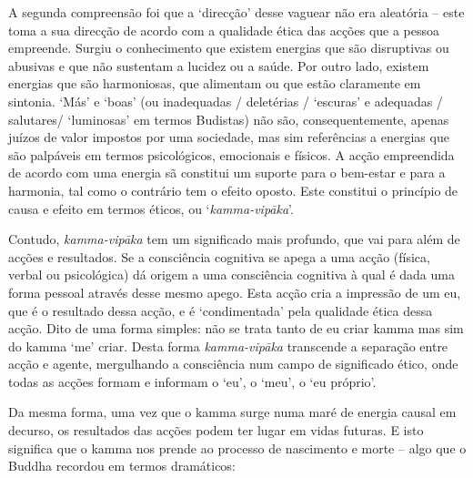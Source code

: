 A segunda compreensão foi que a `direcção' desse vaguear não era aleatória --
este toma a sua direcção de acordo com a qualidade ética das acções que a pessoa
empreende. Surgiu o conhecimento que existem energias que são disruptivas ou
abusivas e que não sustentam a lucidez ou a saúde. Por outro lado, existem
energias que são harmoniosas, que alimentam ou que estão claramente em sintonia.
`Más' e `boas' (ou inadequadas / deletérias / `escuras' e
adequadas / salutares/ `luminosas' em termos Budistas) não são, consequentemente,
apenas juízos de valor impostos por uma sociedade, mas sim referências a
energias que são palpáveis em termos psicológicos, emocionais e físicos. A acção
empreendida de acordo com uma energia sã constitui um suporte para o bem-estar e
para a harmonia, tal como o contrário tem o efeito oposto. Este constitui o
princípio de causa e efeito em termos éticos, ou `\emph{kamma-vipāka}'.

Contudo, \emph{kamma-vipāka} tem um significado mais profundo, que vai para além
de acções e resultados. Se a consciência cognitiva se apega a uma acção (física,
verbal ou psicológica) dá origem a uma consciência cognitiva à qual é dada uma
forma pessoal através desse mesmo apego. Esta acção cria a impressão de um eu,
que é o resultado dessa acção, e é `condimentada' pela qualidade ética dessa
acção. Dito de uma forma simples: não se trata tanto de eu criar kamma mas sim
do kamma `me' criar. Desta forma \emph{kamma-vipāka} transcende a separação
entre acção e agente, mergulhando a consciência num campo de significado ético,
onde todas as acções formam e informam o `eu', o `meu', o `eu próprio'.

Da mesma forma, uma vez que o kamma surge numa maré de energia causal em
decurso, os resultados das acções podem ter lugar em vidas futuras. E isto
significa que o kamma nos prende ao processo de nascimento e morte -- algo que o
Buddha recordou em termos dramáticos:

